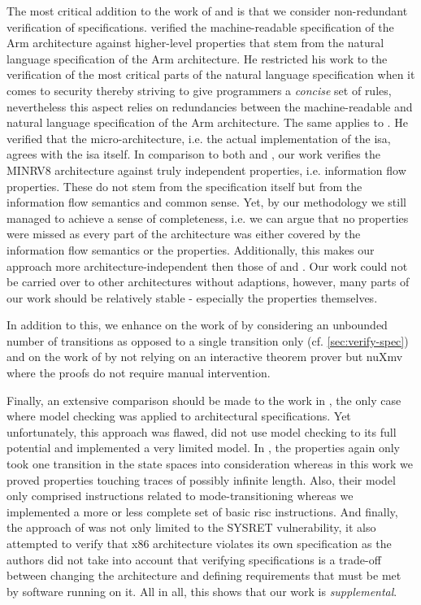 The most critical addition to the work of \cite{Reid17} and \cite{Fox02} is that we consider non-redundant verification of specifications.
\cite{Reid17} verified the machine-readable specification of the Arm architecture against higher-level properties that stem from the natural language specification of the Arm architecture.
He restricted his work to the verification of the most critical parts of the natural language specification when it comes to security thereby striving to give programmers a \textit{concise} set of rules, nevertheless this aspect relies on redundancies between the machine-readable and natural language specification of the Arm architecture.
The same applies to \cite{Fox02}.
He verified that the micro-architecture, i.e. the actual implementation of the \gls{isa}, agrees with the \gls{isa} itself.
In comparison to both \cite{Reid17} and \cite{Fox02}, our work verifies the MINRV8 architecture against truly independent properties, i.e. information flow properties.
These do not stem from the specification itself but from the information flow semantics and common sense.
Yet, by our methodology we still managed to achieve a sense of completeness, i.e. we can argue that no properties were missed as every part of the architecture was either covered by the information flow semantics or the properties.
Additionally, this makes our approach more architecture-independent then those of \cite{Reid17} and \cite{Fox02}.
Our work could not be carried over to other architectures without adaptions, however, many parts of our work should be relatively stable - especially the properties themselves.

In addition to this, we enhance on the work of \cite{Reid17} by considering an unbounded number of transitions as opposed to a single transition only (cf. \ref{sec:verify-spec}) and on the work of \cite{Fox02} by not relying on an interactive theorem prover but nuXmv where the proofs do not require manual intervention.

Finally, an extensive comparison should be made to the work in \cite{BradfieldS16}, the only case where model checking was applied to architectural specifications.
Yet unfortunately, this approach was flawed, did not use model checking to its full potential and implemented a very limited model.
In \cite{BradfieldS16}, the properties again only took one transition in the state spaces into consideration whereas in this work we proved properties touching traces of possibly infinite length.
Also, their model only comprised instructions related to mode-transitioning whereas we implemented a more or less complete set of basic \gls{risc} instructions.
And finally, the approach of \cite{BradfieldS16} was not only limited to the SYSRET vulnerability, it also attempted to verify that x86 architecture violates its own specification as the authors did not take into account that verifying specifications is a trade-off between changing the architecture and defining requirements that must be met by software running on it.
All in all, this shows that our work is \textit{supplemental}.
